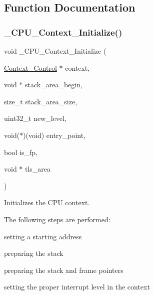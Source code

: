 \subsection{Function Documentation}
\mbox{\label{group__RTEMSScoreCPUEpiphany_ga7b9d8ca4fc632d4e2e0ea4415ac3b868}} 
\subsubsection{\texorpdfstring{\_CPU\_Context\_Initialize()}{\_CPU\_Context\_Initialize()}}
{\footnotesize\ttfamily void \+\_\+\+C\+P\+U\+\_\+\+Context\+\_\+\+Initialize (\begin{DoxyParamCaption}\item[{\mbox{\hyperlink{structContext__Control}{Context\+\_\+\+Control}} $\ast$}]{context,  }\item[{void $\ast$}]{stack\+\_\+area\+\_\+begin,  }\item[{size\+\_\+t}]{stack\+\_\+area\+\_\+size,  }\item[{uint32\+\_\+t}]{new\+\_\+level,  }\item[{void($\ast$)(void)}]{entry\+\_\+point,  }\item[{bool}]{is\+\_\+fp,  }\item[{void $\ast$}]{tls\+\_\+area }\end{DoxyParamCaption})}



Initializes the C\+PU context. 

The following steps are performed\+:
\begin{DoxyItemize}
\item setting a starting address
\item preparing the stack
\item preparing the stack and frame pointers
\item setting the proper interrupt level in the context
\end{DoxyItemize}


